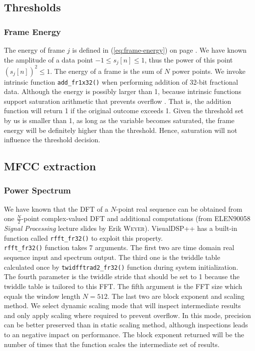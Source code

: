 
\subsection{Thresholds}
\label{subsection:dsp-thresholds}
\subsubsection{Frame Energy}

The energy of frame $j$ is defined in (\ref{eq:frame-energy}) on page \pageref{eq:frame-energy}. We have known the amplitude of a data point $-1 \le s_j[n] \le 1$, thus the power of this point $(s_j[n])^2 \le 1$. The energy of a frame is the sum of $N$ power points. We invoke intrinsic function \texttt{add\_fr1x32()} when performing addition of 32-bit fractional data. Although the energy is possibly larger than 1, because intrinsic functions support saturation arithmetic that prevents overflow \cite{gan2007embedded}. That is, the addition function will return 1 if the original outcome exceeds 1. Given the threshold set by us is smaller than 1, as long as the variable becomes saturated, the frame energy will be definitely higher than the threshold. Hence, saturation will not influence the threshold decision.


\subsection{MFCC extraction}
\subsubsection{Power Spectrum}

We have known that the DFT of a $N$-point real sequence can be obtained from one $\frac{N}{2}$-point complex-valued DFT and additional computations (from ELEN90058 \textit{Signal Processing} lecture slides by Erik \textsc{Weyer}). VisualDSP++ has a built-in function called \texttt{rfft\_fr32()} to exploit this property.\\

\texttt{rfft\_fr32()} function takes 7 arguments. The first two are time domain real sequence input and spectrum output. The third one is the twiddle table calculated once by \texttt{twidfftrad2\_fr32()} function during system initialization. The fourth parameter is the twiddle stride that should be set to 1 because the twiddle table is tailored to this FFT. The fifth argument is the FFT size which equals the window length $N = 512$. The last two are block exponent and scaling method. We select dynamic scaling mode that will inspect intermediate results and only apply scaling where required to prevent overflow. In this mode, precision can be better preserved than in static scaling method, although inspections leads to an negative impact on performance. The block exponent returned will be the number of times that the function scales the intermediate set of results.\\

